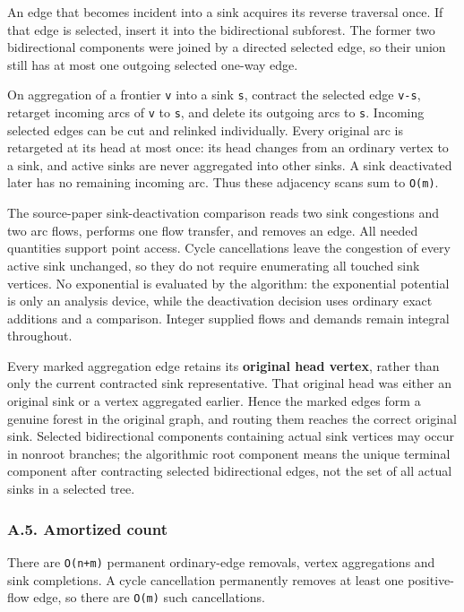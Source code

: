 An edge that becomes incident into a sink acquires its reverse traversal once. If that edge is selected, insert it into the bidirectional subforest. The former two bidirectional components were joined by a directed selected edge, so their union still has at most one outgoing selected one-way edge.

On aggregation of a frontier \texttt{v} into a sink \texttt{s}, contract the selected edge \texttt{v-s}, retarget incoming arcs of \texttt{v} to \texttt{s}, and delete its outgoing arcs to \texttt{s}. Incoming selected edges can be cut and relinked individually. Every original arc is retargeted at its head at most once: its head changes from an ordinary vertex to a sink, and active sinks are never aggregated into other sinks. A sink deactivated later has no remaining incoming arc. Thus these adjacency scans sum to \texttt{O(m)}.

The source-paper sink-deactivation comparison reads two sink congestions and two arc flows, performs one flow transfer, and removes an edge. All needed quantities support point access. Cycle cancellations leave the congestion of every active sink unchanged, so they do not require enumerating all touched sink vertices. No exponential is evaluated by the algorithm: the exponential potential is only an analysis device, while the deactivation decision uses ordinary exact additions and a comparison. Integer supplied flows and demands remain integral throughout.

Every marked aggregation edge retains its \textbf{original head vertex}, rather than only the current contracted sink representative. That original head was either an original sink or a vertex aggregated earlier. Hence the marked edges form a genuine forest in the original graph, and routing them reaches the correct original sink. Selected bidirectional components containing actual sink vertices may occur in nonroot branches; the algorithmic root component means the unique terminal component after contracting selected bidirectional edges, not the set of all actual sinks in a selected tree.

\hypertarget{af-385fd70686-a.5.-amortized-count}{%
\subsubsection{A.5. Amortized count}\label{af-385fd70686-a.5.-amortized-count}}

There are \texttt{O(n+m)} permanent ordinary-edge removals, vertex aggregations and sink completions. A cycle cancellation permanently removes at least one positive-flow edge, so there are \texttt{O(m)} such cancellations.

